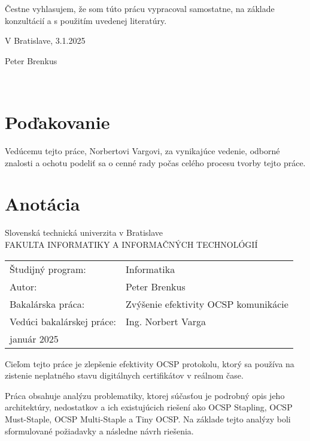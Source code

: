 \documentclass[12pt, twoside]{book}
\def\mfrok{január 2025}
\def\mfnazov{Zvýšenie efektivity OCSP komunikácie}
\def\mfautor{Peter Brenkus}
\def\mfveduci{Ing. Norbert Varga}
\def\program{ Informatika }
\begin{document}
\vfill
\noindent
Čestne vyhlasujem, že som túto prácu vypracoval samostatne, na základe konzultácií a s použitím uvedenej literatúry.

\bigskip
\bigskip
\noindent
V Bratislave, 3.1.2025

{\raggedleft Peter Brenkus\quad \par}
\bigskip

\newpage\null\thispagestyle{empty}\newpage

\newpage
\thispagestyle{empty} 
~

\vfill
\noindent

\section*{Poďakovanie}
\bigskip
\noindent
Vedúcemu tejto práce, Norbertovi Vargovi, za vynikajúce vedenie, odborné znalosti a ochotu podeliť sa o cenné rady počas celého procesu tvorby tejto práce. 
\bigskip
\bigskip
\bigskip
\newpage\null\thispagestyle{empty}\newpage

\newpage 
\thispagestyle{empty}

\section*{Anotácia}
\noindent
Slovenská technická univerzita v Bratislave\\
FAKULTA INFORMATIKY A INFORMAČNÝCH TECHNOLÓGIÍ\\

\begin{tabular}{@{}ll}
Študijný program: & \program\bigskip
\bigskip  \\
Autor: & \mfautor \\
Bakalárska práca: &  \mfnazov \\
Vedúci bakalárskej práce: & \mfveduci \\
\mfrok
\end{tabular}

\bigskip
\bigskip 
\bigskip 
\noindent

Cieľom tejto práce je zlepšenie efektivity OCSP protokolu, ktorý sa používa na zistenie neplatného stavu digitálnych certifikátov v reálnom čase. 

Práca obsahuje analýzu problematiky, ktorej súčasťou je podrobný opis jeho architektúry, nedostatkov a ich existujúcich riešení ako OCSP Stapling, OCSP Must-Staple, OCSP Multi-Staple a Tiny OCSP. Na základe tejto analýzy boli sformulované požiadavky a následne návrh riešenia. 
\end{document}
